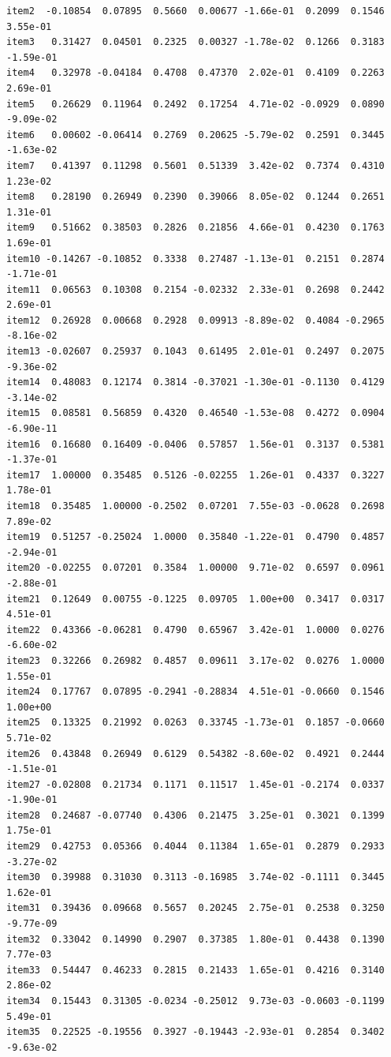 \documentclass[
  a4paper,
]{ltjsbook}
\begin{document}
\begin{verbatim}
item2  -0.10854  0.07895  0.5660  0.00677 -1.66e-01  0.2099  0.1546  3.55e-01
item3   0.31427  0.04501  0.2325  0.00327 -1.78e-02  0.1266  0.3183 -1.59e-01
item4   0.32978 -0.04184  0.4708  0.47370  2.02e-01  0.4109  0.2263  2.69e-01
item5   0.26629  0.11964  0.2492  0.17254  4.71e-02 -0.0929  0.0890 -9.09e-02
item6   0.00602 -0.06414  0.2769  0.20625 -5.79e-02  0.2591  0.3445 -1.63e-02
item7   0.41397  0.11298  0.5601  0.51339  3.42e-02  0.7374  0.4310  1.23e-02
item8   0.28190  0.26949  0.2390  0.39066  8.05e-02  0.1244  0.2651  1.31e-01
item9   0.51662  0.38503  0.2826  0.21856  4.66e-01  0.4230  0.1763  1.69e-01
item10 -0.14267 -0.10852  0.3338  0.27487 -1.13e-01  0.2151  0.2874 -1.71e-01
item11  0.06563  0.10308  0.2154 -0.02332  2.33e-01  0.2698  0.2442  2.69e-01
item12  0.26928  0.00668  0.2928  0.09913 -8.89e-02  0.4084 -0.2965 -8.16e-02
item13 -0.02607  0.25937  0.1043  0.61495  2.01e-01  0.2497  0.2075 -9.36e-02
item14  0.48083  0.12174  0.3814 -0.37021 -1.30e-01 -0.1130  0.4129 -3.14e-02
item15  0.08581  0.56859  0.4320  0.46540 -1.53e-08  0.4272  0.0904 -6.90e-11
item16  0.16680  0.16409 -0.0406  0.57857  1.56e-01  0.3137  0.5381 -1.37e-01
item17  1.00000  0.35485  0.5126 -0.02255  1.26e-01  0.4337  0.3227  1.78e-01
item18  0.35485  1.00000 -0.2502  0.07201  7.55e-03 -0.0628  0.2698  7.89e-02
item19  0.51257 -0.25024  1.0000  0.35840 -1.22e-01  0.4790  0.4857 -2.94e-01
item20 -0.02255  0.07201  0.3584  1.00000  9.71e-02  0.6597  0.0961 -2.88e-01
item21  0.12649  0.00755 -0.1225  0.09705  1.00e+00  0.3417  0.0317  4.51e-01
item22  0.43366 -0.06281  0.4790  0.65967  3.42e-01  1.0000  0.0276 -6.60e-02
item23  0.32266  0.26982  0.4857  0.09611  3.17e-02  0.0276  1.0000  1.55e-01
item24  0.17767  0.07895 -0.2941 -0.28834  4.51e-01 -0.0660  0.1546  1.00e+00
item25  0.13325  0.21992  0.0263  0.33745 -1.73e-01  0.1857 -0.0660  5.71e-02
item26  0.43848  0.26949  0.6129  0.54382 -8.60e-02  0.4921  0.2444 -1.51e-01
item27 -0.02808  0.21734  0.1171  0.11517  1.45e-01 -0.2174  0.0337 -1.90e-01
item28  0.24687 -0.07740  0.4306  0.21475  3.25e-01  0.3021  0.1399  1.75e-01
item29  0.42753  0.05366  0.4044  0.11384  1.65e-01  0.2879  0.2933 -3.27e-02
item30  0.39988  0.31030  0.3113 -0.16985  3.74e-02 -0.1111  0.3445  1.62e-01
item31  0.39436  0.09668  0.5657  0.20245  2.75e-01  0.2538  0.3250 -9.77e-09
item32  0.33042  0.14990  0.2907  0.37385  1.80e-01  0.4438  0.1390  7.77e-03
item33  0.54447  0.46233  0.2815  0.21433  1.65e-01  0.4216  0.3140  2.86e-02
item34  0.15443  0.31305 -0.0234 -0.25012  9.73e-03 -0.0603 -0.1199  5.49e-01
item35  0.22525 -0.19556  0.3927 -0.19443 -2.93e-01  0.2854  0.3402 -9.63e-02

\end{verbatim}
\end{document}
